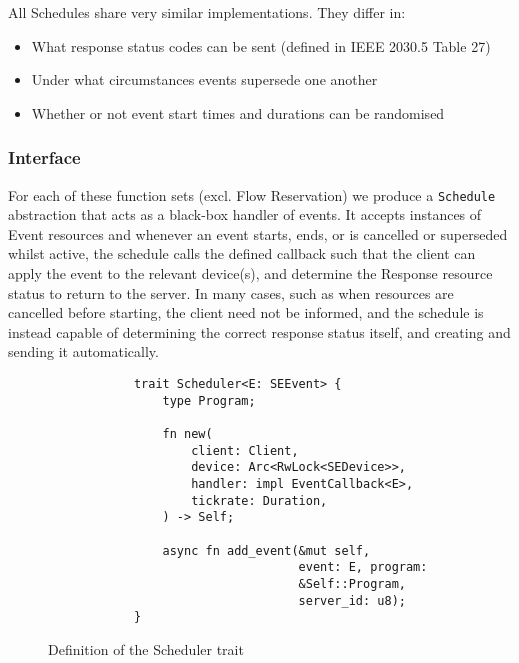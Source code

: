 All Schedules share very similar implementations. They differ in:

\begin{itemize}
    \item What response status codes can be sent (defined in IEEE 2030.5 Table 27)
    \item Under what circumstances events supersede one another
    \item Whether or not event start times and durations can be randomised
\end{itemize}

\subsubsection{Interface}

For each of these function sets (excl. Flow Reservation) we produce a \texttt{Schedule} abstraction that acts as a black-box handler of events. It accepts instances of Event resources and whenever an event starts, ends, or is cancelled or superseded whilst active, the schedule calls the defined callback such that the client can apply the event to the relevant device(s), and determine the Response resource status to return to the server. In many cases, such as when resources are cancelled before starting, the client need not be informed, and the schedule is instead capable of determining the correct response status itself, and creating and sending it automatically.

\begin{figure}[h]
    \begin{center}
        \begin{lstlisting}
            trait Scheduler<E: SEEvent> {
                type Program;

                fn new(
                    client: Client,
                    device: Arc<RwLock<SEDevice>>,
                    handler: impl EventCallback<E>,
                    tickrate: Duration,
                ) -> Self;

                async fn add_event(&mut self, 
                                   event: E, program:
                                   &Self::Program, 
                                   server_id: u8);
            }
        \end{lstlisting}
        \label{fig:schedulertrait}
        \vspace{-10pt}
        \caption{Definition of the Scheduler trait}
    \end{center}
\end{figure}

